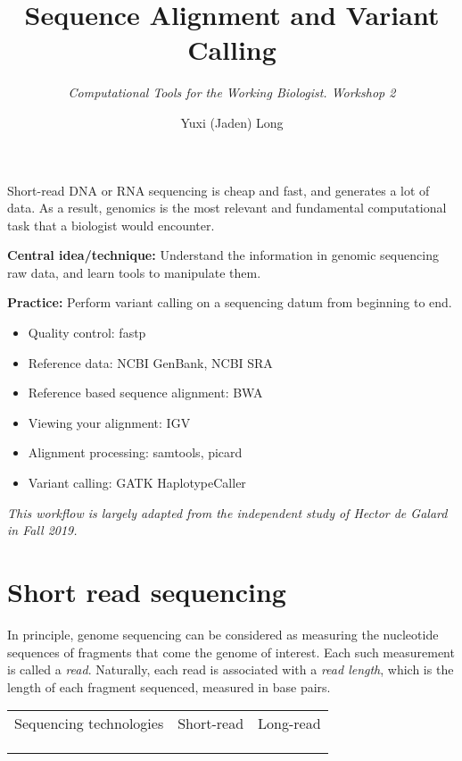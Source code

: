 \documentclass[12pt,letterpaper]{article}
\title{\textbf{Sequence Alignment and Variant Calling}}
\author{\textit{Computational Tools for the Working Biologist. Workshop 2}}
\date{Yuxi (Jaden) Long}
\begin{document}
\maketitle
\thispagestyle{empty}

\vspace{1em}

\noindent
Short-read DNA or RNA sequencing is cheap and fast, and generates a lot of data. As a result, genomics is the most relevant and fundamental computational task that a biologist would encounter.

\noindent
\textbf{Central idea/technique:} Understand the information in genomic sequencing raw data, and learn tools to manipulate them.

\textbf{Practice:} Perform variant calling on a sequencing datum from beginning to end.

\begin{itemize}
   \item Quality control: fastp
   \item Reference data: NCBI GenBank, NCBI SRA
   \item Reference based sequence alignment: BWA
   \item Viewing your alignment: IGV
   \item Alignment processing: samtools, picard
   \item Variant calling: GATK HaplotypeCaller
\end{itemize}

\textit{This workflow is largely adapted from the independent study of Hector de Galard in Fall 2019.}

\section{Short read sequencing}

In principle, genome sequencing can be considered as measuring the nucleotide sequences of fragments that come the genome of interest. Each such measurement is called a \textit{read}. Naturally, each read is associated with a \textit{read length}, which is the length of each fragment sequenced, measured in base pairs.

\begin{table}[]
\begin{center}
\begin{tabular}{|l|l|l|}
\hline
Sequencing technologies & Short-read & Long-read   \\
 &  &    \\
 &  &    \\
 &  &
\end{tabular}
\end{center}
\end{table}



\end{document}
